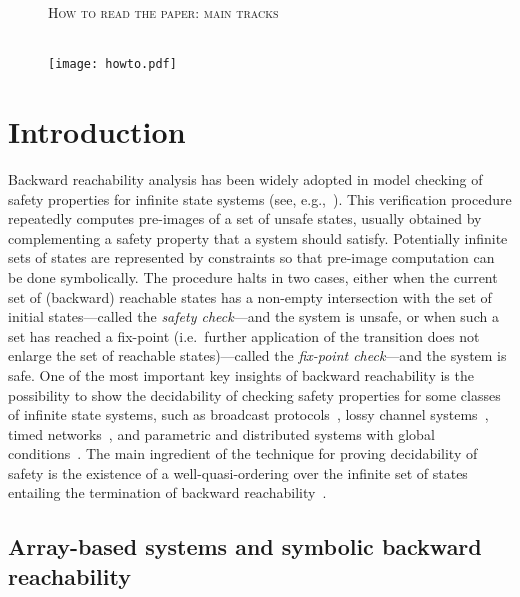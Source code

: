 \documentclass{LMCS}
\theoremstyle{plain}\newtheorem{assumption}[thm]{Assumption}
\theoremstyle{plain}\newtheorem{proposition}[thm]{Proposition}
\theoremstyle{plain}\newtheorem{property}[thm]{Property}
\theoremstyle{plain}\newtheorem{example}[thm]{Example}
\theoremstyle{plain}\newtheorem{claim}[thm]{Claim}
\theoremstyle{plain}\newtheorem{lemma}[thm]{Lemma}
\begin{document}
\maketitle

\newpage

\tableofcontents
\begin{figure}[b]
  \centering
  \textsc{How to read the paper: main tracks}

  \ \\

  \texttt{[image: howto.pdf]}
\end{figure}



\section{Introduction}

Backward reachability analysis has been widely adopted in model
checking of safety properties for infinite state systems (see,
e.g.,~\cite{lics}).  This verification procedure repeatedly computes
pre-images of
a set of unsafe states, usually obtained by complementing a safety
property that a system should satisfy.  Potentially infinite sets of
states are represented by constraints so that pre-image computation
can be done symbolically.  The procedure halts in two cases, either
when the current set of (backward) reachable states has a non-empty
intersection with the set of initial states---called the \emph{safety
  check}---and the system is unsafe, or when such a set has reached a
fix-point (i.e.\ further application of the transition does not
enlarge the set of reachable states)---called the \emph{fix-point
  check}---and the system is safe.  One of the most important key
insights of backward reachability is the possibility to show the
decidability of checking safety properties for some classes of
infinite state systems, such as broadcast protocols~\cite{bro1,bro2},
lossy channel systems~\cite{lossy-channels}, timed
networks~\cite{AbdullaTCS}, and parametric and distributed systems
with global conditions~\cite{cav06,vmcai08}.  The main ingredient of
the technique for proving decidability of safety is the existence of a
well-quasi-ordering
over the infinite set of states entailing the termination of backward
reachability~\cite{lics}.

\subsection{Array-based systems and symbolic backward reachability}
\end{document}
